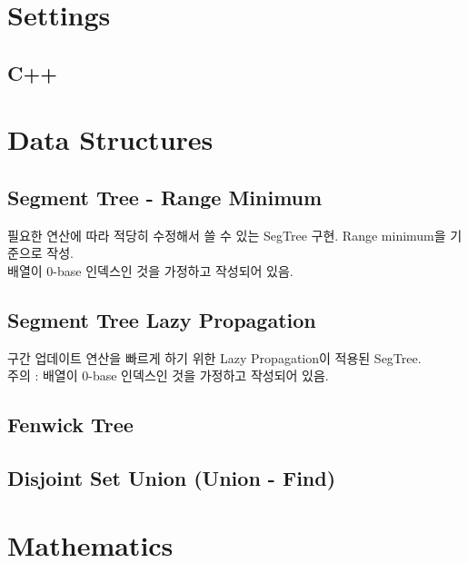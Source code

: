 \documentclass[landscape,8pt]{article}
\begin{document}
\newpage
\maketitle
\begin{multicols}{3}\raggedcolumns
\tableofcontents
\end{multicols}
\pagebreak
\begin{multicols}{2}\raggedcolumns


\section{Settings}
  \subsection{C++}
    
\section{Data Structures}
  \subsection{Segment Tree - Range Minimum}
     필요한 연산에 따라 적당히 수정해서 쓸 수 있는 SegTree 구현. Range minimum을 기준으로 작성.\\
     배열이 0-base 인덱스인 것을 가정하고 작성되어 있음.
     

  \subsection{Segment Tree Lazy Propagation}
     구간 업데이트 연산을 빠르게 하기 위한 Lazy Propagation이 적용된 SegTree.\\
     주의 : 배열이 0-base 인덱스인 것을 가정하고 작성되어 있음.
     
    \columnbreak
  \subsection{Fenwick Tree}
    
  \subsection{Disjoint Set Union (Union - Find)}
    

\section{Mathematics}

\end{multicols}
\end{document}
